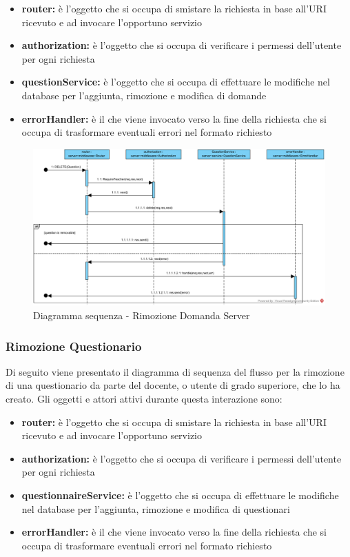 \documentclass[12pt,a4paper]{article}
\begin{document}
\begin{itemize}
	\item \textbf{router:} è l'oggetto che si occupa di smistare la richiesta in base all’URI ricevuto e ad invocare l’opportuno servizio
	\item \textbf{authorization:} è l'oggetto che si occupa di verificare i permessi dell'utente per ogni richiesta	
	\item \textbf{questionService:} è l'oggetto che si occupa di effettuare le modifiche nel database per l'aggiunta, rimozione e modifica di domande
	\item \textbf{errorHandler:} è il  che viene invocato verso la fine della richiesta che si occupa di trasformare eventuali errori nel formato  richiesto
\end{itemize}

\begin{center}
	\begin{figure}[H]
		\centering \includegraphics[max width=\myheight, angle=90]{../img/diagrammiSequenza/rimozioneDomandaServer.png}
		\caption{Diagramma sequenza - Rimozione Domanda Server}
	\end{figure}
\end{center}

\newpage
\subsubsection{Rimozione Questionario}
Di seguito viene presentato il diagramma di sequenza del flusso per la rimozione di una questionario da parte del docente, o utente di grado superiore, che lo ha creato. Gli oggetti e attori attivi durante questa interazione sono:

\begin{itemize}
	\item \textbf{router:} è l'oggetto che si occupa di smistare la richiesta in base all’URI ricevuto e ad invocare l’opportuno servizio
	\item \textbf{authorization:} è l'oggetto che si occupa di verificare i permessi dell'utente per ogni richiesta	
	\item \textbf{questionnaireService:} è l'oggetto che si occupa di effettuare le modifiche nel database per l'aggiunta, rimozione e modifica di questionari
	\item \textbf{errorHandler:} è il  che viene invocato verso la fine della richiesta che si occupa di trasformare eventuali errori nel formato  richiesto
\end{itemize}
\end{document}
